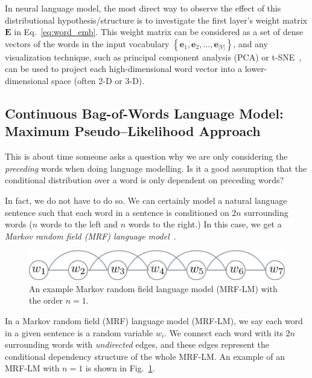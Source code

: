 \documentclass{report}
\newcommand{\vect}[1]{\mathbf{#1}}
\newcommand{\matr}[1]{\mathbf{#1}}
\newcommand{\ve}[0]{\vect{e}}
\newcommand{\mE}[0]{\matr{E}}
\newcommand{\alert}[1]{\textcolor{red}{#1}}
\begin{document}
In neural language model, the most direct way to observe the effect of this
distributional hypothesis/structure is to investigate the first layer's weight
matrix $\mE$ in Eq.~\eqref{eq:word_emb}. This weight matrix can be considered as
a set of dense vectors of the words in the input vocabulary $\left\{ \ve_1,
\ve_2, \ldots, \ve_{|V|}\right\}$, and any visualization technique, such as
principal component analysis (PCA) or t-SNE~\cite{VanDerMaaten08}, can be used
to project each high-dimensional word vector into a lower-dimensional space
(often 2-D or 3-D). 

%


\subsection{Continuous Bag-of-Words Language Model: \\ Maximum Pseudo--Likelihood
Approach}
\label{sec:cbow}

This is about time someone asks a question why we are only considering the {\em
preceding} words when doing language modelling. Is it a good assumption that the
conditional distribution over a word is only dependent on preceding words? 

In fact, we do not have to do so. We can certainly model a natural language
sentence such that each word in a sentence is conditioned on $2n$ surrounding
words ($n$ words to the left and $n$ words to the right.) In this case, we get a
{\em Markov random field (MRF) language model}~\cite{jernite2015fast}.

\begin{figure}[ht]
    \centering
    \includegraphics[width=\textwidth]{figures/mrflm.pdf}
    \caption{An example Markov random field language model (MRF-LM) with the
    order $n=1$.}
    \label{fig:mrf_lm}
\end{figure}

In a Markov random field (MRF) language model (MRF-LM), we say each word in a
given sentence is a random variable $w_i$. We connect each word with its $2n$
surrounding words with {\em undirected} edges, and these edges represent the
conditional dependency structure of the whole MRF-LM. An example of an MRF-LM
with $n=1$ is shown in Fig.~\ref{fig:mrf_lm}.
\end{document}
